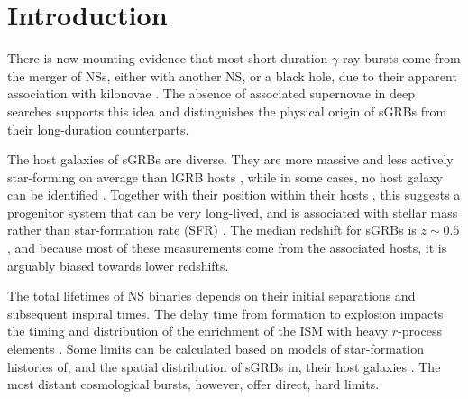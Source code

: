 \documentclass{aa}    %
\begin{document}
\maketitle

\section{Introduction}


There is now mounting evidence that most short-duration $\gamma$-ray bursts
come from the merger of NSs, either with another NS, or a black
hole, due to their apparent association with kilonovae \citep{Barnes2013a,
	Tanvir2013b, Yang2015, Jin2016, Rosswog2016}. The absence of associated
supernovae in deep searches \citep[e.g.][]{Hjorth2005a,Fox2005,Hjorth2005b}
supports this idea and distinguishes the physical origin of sGRBs from their
long-duration counterparts. %

The host galaxies of sGRBs are diverse. They are more massive and less actively 
star-forming on average than lGRB hosts \citep{Fong2013b}, while in some cases, no host 
galaxy can be identified \citep{Berger2010a, Tunnicliffe2014}. Together with their position 
within their hosts \citep{Fong2013a}, this suggests a progenitor system that can be very
long-lived, and is associated with stellar mass rather than star-formation rate (SFR)
\citep{Berger2014}. The median redshift for sGRBs is $z\sim0.5$ \citep{Berger2014}, and
because most of these measurements come from the associated hosts, it is arguably biased
towards lower redshifts.


The total lifetimes of NS binaries depends on their initial separations and
subsequent inspiral times. The delay time from formation to explosion impacts
the timing and distribution of the enrichment of the ISM with heavy $r$-process
elements \citep{VandeVoort2015, Wallner2015,  Ji2016}. Some limits can be
calculated based on models of star-formation histories of, and the spatial
distribution of sGRBs in, their host galaxies \citep[][]{Berger2014}. The most
distant cosmological bursts, however, offer direct, hard limits.
\end{document}
